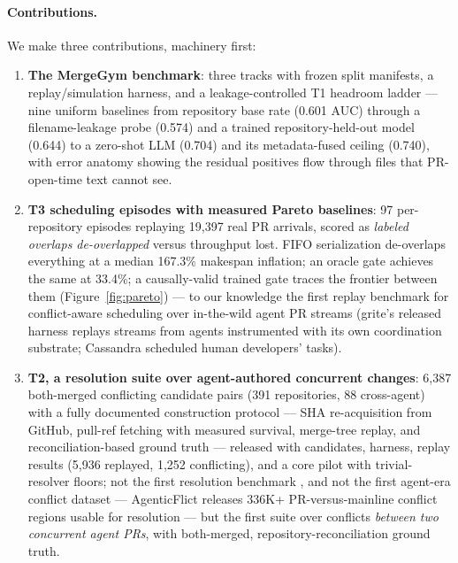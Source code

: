 \documentclass{article}
\begin{document}
\paragraph{Contributions.} We make three contributions, machinery first:
\begin{enumerate}
  \item \textbf{The MergeGym benchmark}: three tracks with frozen split manifests, a replay/simulation harness, and a leakage-controlled T1 headroom ladder --- nine uniform baselines from repository base rate (0.601 AUC) through a filename-leakage probe (0.574) and a trained repository-held-out model (0.644) to a zero-shot LLM (0.704) and its metadata-fused ceiling (0.740), with error anatomy showing the residual positives flow through files that PR-open-time text cannot see. %
  \item \textbf{T3 scheduling episodes with measured Pareto baselines}: 97 per-repository episodes replaying 19{,}397 real PR arrivals, scored as \emph{labeled overlaps de-overlapped} versus throughput lost. FIFO serialization de-overlaps everything at a median 167.3\% makespan inflation; an oracle gate achieves the same at 33.4\%; a causally-valid trained gate traces the frontier between them (Figure~\ref{fig:pareto}) --- to our knowledge the first replay benchmark for conflict-aware scheduling over in-the-wild agent PR streams (grite's released harness \citep{sarkar2026grite} replays streams from agents instrumented with its own coordination substrate; Cassandra \citep{kasi2013cassandra} scheduled human developers' tasks). %
  \item \textbf{T2, a resolution suite over agent-authored concurrent changes}: 6{,}387 both-merged conflicting candidate pairs (391 repositories, 88 cross-agent) with a fully documented construction protocol --- SHA re-acquisition from GitHub, pull-ref fetching with measured survival, merge-tree replay, and reconciliation-based ground truth --- released with candidates, harness, replay results (5{,}936 replayed, 1{,}252 conflicting), and a core pilot with trivial-resolver floors; not the first resolution benchmark \citep{schesch2026mergebench,congra2024,shen2024conflictbench}, and not the first agent-era conflict dataset --- AgenticFlict \citep{ogenrwot2026agenticflict} releases 336K+ PR-versus-mainline conflict regions usable for resolution --- but the first suite over conflicts \emph{between two concurrent agent PRs}, with both-merged, repository-reconciliation ground truth. %
\end{enumerate}
\end{document}
